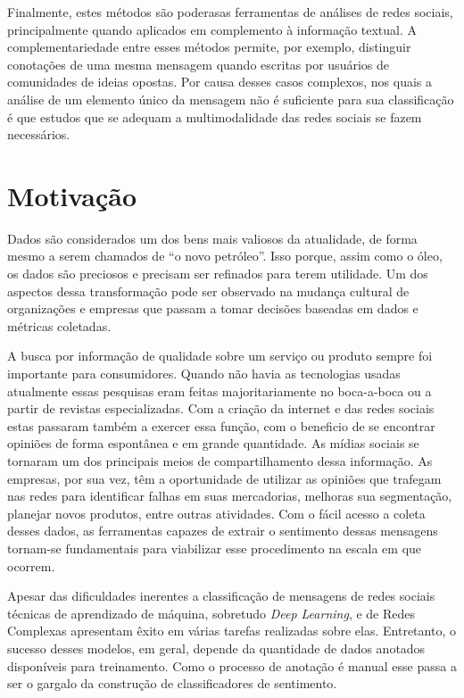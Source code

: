 Finalmente, estes métodos são poderasas ferramentas de análises de redes sociais,
principalmente quando aplicados em complemento à informação textual.
A complementariedade entre esses métodos permite, por exemplo, distinguir
conotações de uma mesma mensagem quando escritas por usuários de comunidades de
ideias opostas.
Por causa desses casos complexos, nos quais a análise de um elemento único da
mensagem não é suficiente para sua classificação é que estudos que se adequam a
multimodalidade das redes sociais se fazem necessários.

\section{Motivação}

Dados são considerados um dos bens mais valiosos da atualidade, de forma mesmo a
serem chamados de ``o novo petróleo''.
Isso porque, assim como o óleo, os dados são preciosos e precisam ser refinados
para terem utilidade.
Um dos aspectos dessa transformação pode ser observado na mudança cultural de
organizações e empresas que passam a tomar decisões baseadas em dados e métricas
coletadas.

A busca por informação de qualidade sobre um serviço ou produto sempre foi
importante para consumidores.
Quando não havia as tecnologias usadas atualmente essas pesquisas eram feitas
majoritariamente no boca-a-boca ou a partir de revistas especializadas.
Com a criação da internet e das redes sociais estas passaram também a exercer
essa função, com o beneficio de se encontrar opiniões de forma espontânea e em
grande quantidade.
As mídias sociais se tornaram um dos principais meios de compartilhamento dessa
informação.
As empresas, por sua vez, têm a oportunidade de utilizar as opiniões que
trafegam nas redes para identificar falhas em suas mercadorias, melhoras sua
segmentação, planejar novos produtos, entre outras atividades.
Com o fácil acesso a coleta desses dados, as ferramentas capazes de extrair o
sentimento dessas mensagens tornam-se fundamentais para viabilizar esse
procedimento na escala em que ocorrem.

Apesar das dificuldades inerentes a classificação de mensagens de redes sociais
técnicas de aprendizado de máquina, sobretudo \textit{Deep Learning}, e de Redes
Complexas apresentam êxito em várias tarefas realizadas sobre elas.
Entretanto, o sucesso desses modelos, em geral, depende da quantidade de dados
anotados disponíveis para treinamento.
Como o processo de anotação é manual esse passa a ser o gargalo da construção de
classificadores de sentimento.

